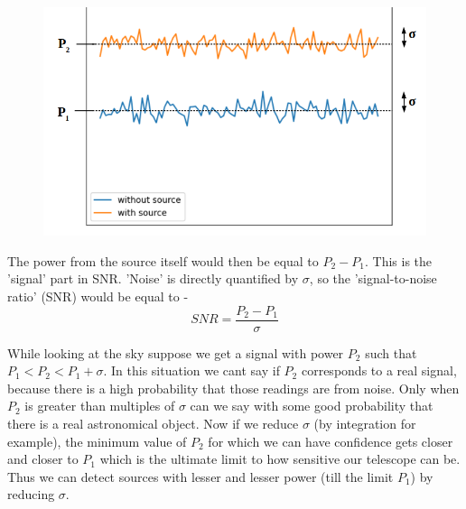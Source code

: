 \documentclass[12pt,a4paper, margin=3in]{article}
\begin{document}
\begin{figure}[htp]
    \centering
    \includegraphics[width=18cm]{image}
\end{figure}

\vspace{15}

The power from the source itself would then be equal to $P_2 - P_1$. This is the 'signal' part in SNR. 'Noise' is directly quantified by $\sigma$, so the 'signal-to-noise ratio' (SNR) would be equal to - \begin{equation}SNR = \frac{P_2 - P_1}{\sigma} \end{equation}

While looking at the sky suppose we get a signal with power $P_2$ such that $P_1 < P_2 < P_1 + \sigma$. In this situation we cant say if $P_2$ corresponds to a real signal, because there is a high probability that those readings are from noise. Only when $P_2$ is greater than multiples of $\sigma$ can we say with some good probability that there is a real astronomical object. Now if we reduce $\sigma$ (by integration for example), the minimum value of $P_2$ for which we can have confidence gets closer and closer to $P_1$ which is the ultimate limit to how sensitive our telescope can be. Thus we can detect sources with lesser and lesser power (till the limit $P_1$) by reducing $\sigma$.
\end{document}
